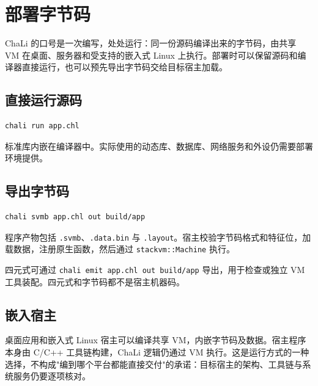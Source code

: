 \chapter{部署字节码}
\label{ch:22}

ChaLi 的口号是一次编写，处处运行：同一份源码编译出来的字节码，由共享 VM 在桌面、服务器和受支持的嵌入式 Linux 上执行。部署时可以保留源码和编译器直接运行，也可以预先导出字节码交给目标宿主加载。

\section{直接运行源码}

\par
\medskip
\begin{lstlisting}[style=sh]
chali run app.chl
\end{lstlisting}
\par
\medskip

标准库内嵌在编译器中。实际使用的动态库、数据库、网络服务和外设仍需要部署环境提供。

\section{导出字节码}

\par
\medskip
\begin{lstlisting}[style=sh]
chali svmb app.chl out build/app
\end{lstlisting}
\par
\medskip

程序产物包括 \texttt{.\allowbreak{}svmb}、\texttt{.\allowbreak{}data.\allowbreak{}bin} 与 \texttt{.\allowbreak{}layout}。宿主校验字节码格式和特征位，加载数据，注册原生函数，然后通过 \texttt{stackvm:\allowbreak{}:\allowbreak{}Machine} 执行。

四元式可通过 \texttt{chali emit app.\allowbreak{}chl out build/\allowbreak{}app} 导出，用于检查或独立 VM 工具装配。四元式和字节码都不是宿主机器码。

\section{嵌入宿主}

桌面应用和嵌入式 Linux 宿主可以编译共享 VM，内嵌字节码及数据。宿主程序本身由 C/C++ 工具链构建，ChaLi 逻辑仍通过 VM 执行。这是运行方式的一种选择，不构成"编到哪个平台都能直接交付"的承诺：目标宿主的架构、工具链与系统服务仍要逐项核对。

